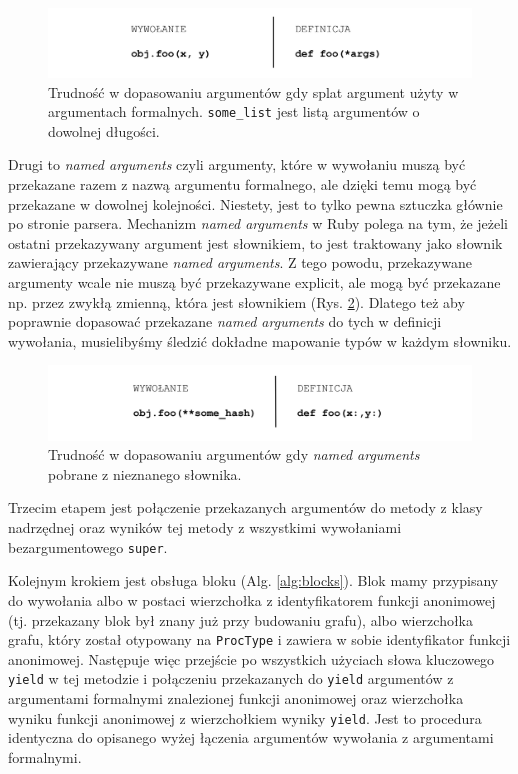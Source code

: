 \documentclass[shortabstract,mgr]{iithesis}
\begin{document}
\begin{figure}[htb]
	\centering
	\includegraphics[scale=0.6]{imgs/formal-splat.png}
	\caption{Trudność w dopasowaniu argumentów gdy splat argument użyty w argumentach formalnych. 	\texttt{some\_list} jest listą argumentów o dowolnej długości.}
	\label{fig:formal-splat}
\end{figure}

Drugi to \textit{named arguments} czyli argumenty, które w wywołaniu muszą być przekazane razem z nazwą argumentu formalnego, ale dzięki temu mogą być przekazane w dowolnej kolejności. Niestety, jest to tylko pewna sztuczka głównie po stronie parsera. Mechanizm \textit{named arguments} w Ruby polega na tym, że jeżeli ostatni przekazywany argument jest słownikiem, to jest traktowany jako słownik zawierający przekazywane \textit{named arguments}. Z tego powodu, przekazywane argumenty wcale nie muszą być przekazywane explicit, ale mogą być przekazane np. przez zwykłą zmienną, która jest słownikiem (Rys. \ref{fig:named-args}). Dlatego też aby poprawnie dopasować przekazane \textit{named arguments} do tych w definicji wywołania, musielibyśmy śledzić dokładne mapowanie typów w każdym słowniku.

\begin{figure}[htb]
	\centering
	\includegraphics[scale=0.6]{imgs/named-args.png}
	\caption{Trudność w dopasowaniu argumentów gdy \emph{named arguments} pobrane z nieznanego słownika.}
	\label{fig:named-args}
\end{figure}

Trzecim etapem jest połączenie przekazanych argumentów do metody z klasy nadrzędnej oraz wyników tej metody z wszystkimi wywołaniami bezargumentowego \texttt{super}.

Kolejnym krokiem jest obsługa bloku (Alg. \ref{alg:blocks}). Blok mamy przypisany do wywołania albo w postaci wierzchołka z identyfikatorem funkcji anonimowej (tj. przekazany blok był znany już przy budowaniu grafu), albo wierzchołka grafu, który został otypowany na \texttt{ProcType} i zawiera w sobie identyfikator funkcji anonimowej. Następuje więc przejście po wszystkich użyciach słowa kluczowego \texttt{yield} w tej metodzie i połączeniu przekazanych do \texttt{yield} argumentów z argumentami formalnymi znalezionej funkcji anonimowej oraz wierzchołka wyniku funkcji anonimowej z wierzchołkiem wyniky \texttt{yield}. Jest to procedura identyczna do opisanego wyżej łączenia argumentów wywołania z argumentami formalnymi.
\end{document}
